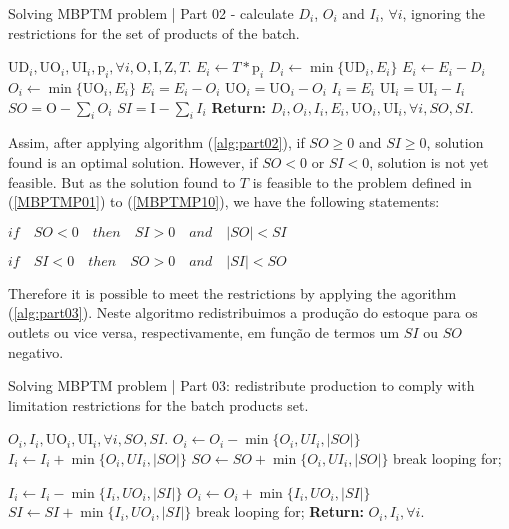 \documentclass[authoryear,manuscript,12pt]{elsarticle}
\begin{document}
\begin{algorithm}
\caption{Solving MBPTM problem | Part 02 - calculate $D_i$, $O_i$ and $I_i$, $\forall i$, ignoring the restrictions for the set of products of the batch.}\label{alg:part02}
\begin{algorithmic}
	\Require $\textrm{UD}_i, \textrm{UO}_i, \textrm{UI}_i, \textrm{p}_i, \forall i, \textrm{O}, \textrm{I}, \textrm{Z}, T$.
		\State $E_i \gets T * \textrm{p}_i$
		\State $D_i \gets \min \{\textrm{UD}_i, E_i\}$
		\State $E_i \gets E_i - D_i$
		\State $O_i \gets \min \{\textrm{UO}_i, E_i\}$
		\State $E_i = E_i - O_i$
		\State $\textrm{UO}_i = \textrm{UO}_i - O_i$
		\State $I_i = E_i$
		\State $\textrm{UI}_i = \textrm{UI}_i - I_i$
	\EndFor
	\State $SO = \textrm{O} - \sum_i{O_i}$
	\State $SI = \textrm{I} - \sum_i{I_i}$
	\State \textbf{Return:} $D_i, O_i, I_i, E_i, \textrm{UO}_i, \textrm{UI}_i, \forall i, SO, SI$.
\end{algorithmic}
\end{algorithm}

Assim, after applying algorithm (\ref{alg:part02}), if $SO \geq 0$ and $SI \geq 0$, solution found is an optimal solution. However, if $SO < 0$ or $SI <0$, solution is not yet feasible. But as the solution found to $T$ is feasible to the problem defined in (\ref{MBPTMP01}) to (\ref{MBPTMP10}), we have the following statements:

$if \quad SO < 0 \quad then \quad SI > 0 \quad and  \quad |SO| < SI$

$if \quad SI < 0 \quad then \quad SO > 0 \quad and  \quad |SI| < SO$

Therefore it is possible to meet the restrictions by applying the agorithm (\ref{alg:part03}). Neste algoritmo redistribuimos a produção do estoque para os outlets ou vice versa, respectivamente, em função de termos um $SI$ ou $SO$ negativo.

\begin{algorithm}
\caption{Solving MBPTM problem | Part 03: redistribute production to comply with limitation restrictions for the batch products set.}\label{alg:part03}
\begin{algorithmic}
\Require $O_i, I_i, \textrm{UO}_i, \textrm{UI}_i, \forall i, SO, SI$.
	\State $O_i \gets O_i - \min\{ O_i, UI_i, |SO|\}$
	\State $I_i \gets I_i + \min\{ O_i, UI_i, |SO|\}$
	\State $SO \gets SO + \min\{ O_i, UI_i, |SO|\}$
		break looping for;
	\EndIf
\EndFor
\EndIf

	\State $I_i \gets I_i - \min\{ I_i, UO_i, |SI|\}$
	\State $O_i \gets O_i + \min\{ I_i, UO_i, |SI|\}$
	\State $SI \gets SI + \min\{ I_i, UO_i, |SI|\}$
		break looping for;
	\EndIf
\EndFor
\EndIf
\State \textbf{Return:} $O_i, I_i, \forall i$.
\end{algorithmic}
\end{algorithm}
\end{document}
